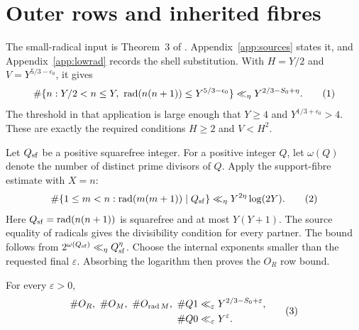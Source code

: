 \section{Outer rows and inherited fibres}\label{sec:outer}

The small-radical input is Theorem~3 of \cite{Paper1}.
Appendix~\ref{app:sources} states it, and Appendix~\ref{app:lowrad}
records the shell substitution. With \(H=Y/2\) and
\(V=Y^{5/3-\epsilon_0}\), it gives
\[
\#\{n:Y/2<n\le Y,\ \operatorname{rad}(n(n+1))\le
Y^{5/3-\epsilon_0}\}
\ll_\eta Y^{2/3-S_0+\eta}.
\AutoTag{eq:old:4_2}
\]
The threshold in that application is large enough that
\(Y\ge4\) and \(Y^{1/3+\epsilon_0}>4\). These are exactly the required
conditions \(H\ge2\) and \(V<H^2\).

Let \(Q_{\rm sf}\) be a positive squarefree integer. For a positive
integer \(Q\), let \(\omega(Q)\) denote the number of distinct prime
divisors of \(Q\). Apply the support-fibre estimate
\cite[Lemma~2.1]{Paper1} with \(X=n\):
\[
\#\{1\le m<n:\operatorname{rad}(m(m+1))\mid Q_{\rm sf}\}
 \ll_\eta Y^{2\eta}\log(2Y).
\AutoTag{eq:old:4_3}
\]
Here \(Q_{\rm sf}=\operatorname{rad}(n(n+1))\) is squarefree and at most
\(Y(Y+1)\). The source equality of radicals gives the divisibility
condition for every partner. The bound follows from
\(2^{\omega(Q_{\rm sf})}\ll_\eta Q_{\rm sf}^\eta\). Choose the
internal exponents smaller than the requested final \(\varepsilon\).
Absorbing the logarithm then proves the \(O_R\) row bound.

\begin{proposition}\label{prop:outerrows}
For every \(\varepsilon>0\),
\[
\begin{aligned}
\#O_R,\ \#O_M,\ \#O_{\operatorname{rad}M},\ \#Q1
  &\ll_\varepsilon Y^{2/3-S_0+\varepsilon},\\
\#Q0&\ll_\varepsilon Y^\varepsilon.
\end{aligned}\AutoTag{eq:old:4_4}
\]
\end{proposition}

